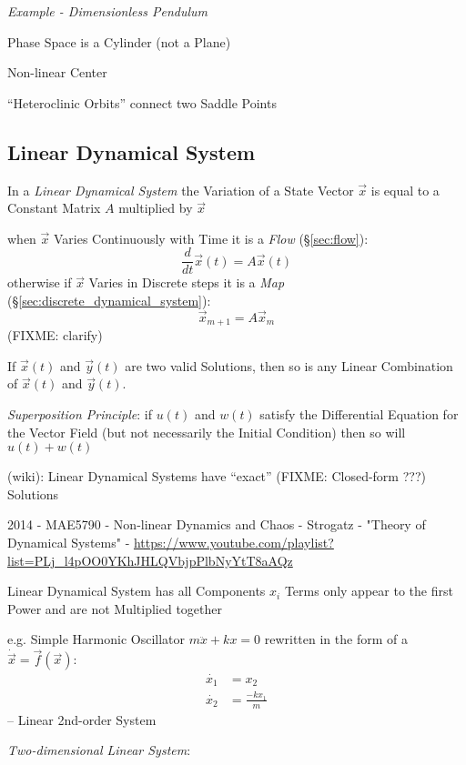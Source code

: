 \emph{Example - Dimensionless Pendulum}

Phase Space is a Cylinder (not a Plane)

Non-linear Center

``Heteroclinic Orbits'' connect two Saddle Points



\subsection{Linear Dynamical System}\label{sec:linear_dynamical_system}

In a \emph{Linear Dynamical System} the Variation of a State Vector $\vec{x}$
is equal to a Constant Matrix $A$ multiplied by $\vec{x}$

when $\vec{x}$ Varies Continuously with Time it is a \emph{Flow}
(\S\ref{sec:flow}):
\[
  \frac{d}{dt}\vec{x}(t) = A\vec{x}(t)
\]
otherwise if $\vec{x}$ Varies in Discrete steps it is a \emph{Map}
(\S\ref{sec:discrete_dynamical_system}):
\[
  \vec{x}_{m+1} = A\vec{x}_m
\]
(FIXME: clarify)

If $\vec{x}(t)$ and $\vec{y}(t)$ are two valid Solutions, then so is any Linear
Combination of $\vec{x}(t)$ and $\vec{y}(t)$.

\emph{Superposition Principle}: if $u(t)$ and $w(t)$ satisfy the Differential
Equation for the Vector Field (but not necessarily the Initial Condition) then
so will $u(t) + w(t)$

(wiki): Linear Dynamical Systems have ``exact'' (FIXME: Closed-form ???)
Solutions

\asterism

2014 - MAE5790 - Non-linear Dynamics and Chaos - Strogatz - "Theory of
Dynamical Systems" -
\url{https://www.youtube.com/playlist?list=PLj_l4pOO0YKhJHLQVbjpPlbNyYtT8aAQz}

Linear Dynamical System has all Components $x_i$ Terms only appear to the first
Power and are not Multiplied together

e.g. Simple Harmonic Oscillator $m\ddot{x} + kx = 0$
rewritten in the form of a $\dot{\vec{x}} = \vec{f}(\vec{x})$:
\begin{align*}
  \dot{x_1} & = x_2 \\
  \dot{x_2} & = \frac{-kx_1}{m}
\end{align*}
-- Linear 2nd-order System

\emph{Two-dimensional Linear System}:

